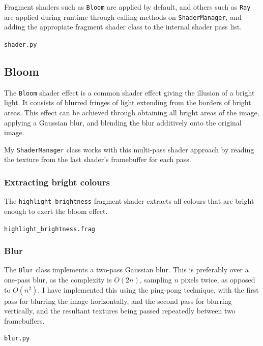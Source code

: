 \documentclass[../main/main.tex]{subfiles}
\begin{document}
Fragment shaders such as \lstinline{Bloom} are applied by default, and others such as \lstinline{Ray} are applied during runtime through calling methods on \lstinline{ShaderManager}, and adding the appropiate fragment shader class to the internal shader pass list.

\noindent\verb|shader.py|


\subsection{Bloom}
\label{sec:shader-bloom}
The \lstinline{Bloom} shader effect is a common shader effect giving the illusion of a bright light. It consists of blurred fringes of light extending from the borders of bright areas. This effect can be achieved through obtaining all bright areas of the image, applying a Gaussian blur, and blending the blur additively onto the original image.

My \lstinline{ShaderManager} class works with this multi-pass shader approach by reading the texture from the last shader's framebuffer for each pass.

\subsubsection*{Extracting bright colours}
The \lstinline{highlight_brightness} fragment shader extracts all colours that are bright enough to exert the bloom effect.

\noindent\verb|highlight_brightness.frag|


\subsubsection*{Blur}
The \lstinline{Blur} class implements a two-pass Gaussian blur. This is preferably over a one-pass blur, as the complexity is $O(2n)$, sampling $n$ pixels twice, as opposed to $O(n^2)$. I have implemented this using the ping-pong technique, with the first pass for blurring the image horizontally, and the second pass for blurring vertically, and the resultant textures being passed repeatedly between two framebuffers.

\noindent\verb|blur.py|

\end{document}
